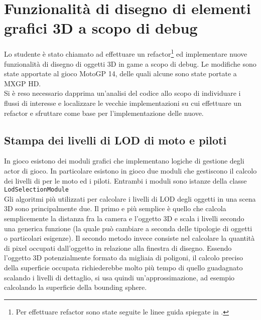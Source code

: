 
\chapter{Funzionalità di disegno di elementi grafici 3D a scopo di debug}
\label{cap:game}

Lo studente è stato chiamato ad effettuare un refactor\footnote{Per effettuare refactor sono state seguite le linee guida spiegate in \cite{inbook:refactoring-book}.} ed implementare nuove funzionalità di disegno di oggetti 3D in game a scopo di debug. Le modifiche sono state apportate al gioco MotoGP 14, delle quali alcune sono state portate a MXGP HD.\\

Si è reso necessario dapprima un'analisi del codice allo scopo di individuare i flussi di interesse e localizzare le vecchie implementazioni su cui effettuare un refactor e sfruttare come base per l'implementazione delle nuove.\\

\section{Stampa dei livelli di LOD di moto e piloti}

In gioco esistono dei moduli grafici che implementano logiche di gestione degli actor di gioco. In particolare esistono in gioco due moduli che gestiscono il calcolo dei livelli di  per le moto ed i piloti. Entrambi i moduli sono istanze della classe \texttt{LodSelectionModule}\\

Gli algoritmi più utilizzati per calcolare i livelli di LOD degli oggetti in una scena 3D sono principalmente due. Il primo e più semplice è quello che calcola semplicemente la distanza fra la camera e l'oggetto 3D e scala i livelli secondo una generica funzione (la quale può cambiare a seconda delle tipologie di oggetti o particolari esigenze). Il secondo metodo invece consiste nel calcolare la quantità di pixel occupati dall'oggetto in relazione alla finestra di disegno. Essendo l'oggetto 3D potenzialmente formato da migliaia di poligoni, il calcolo preciso della superficie occupata richiederebbe molto più tempo di quello guadagnato scalando i livelli di dettaglio, si usa quindi un'approssimazione, ad esempio calcolando la superficie della bounding sphere.\\

